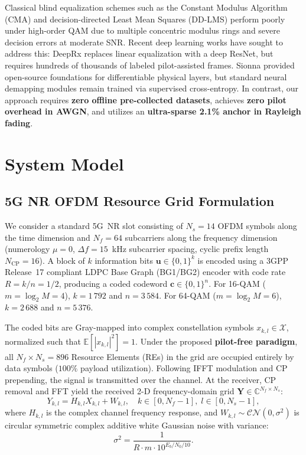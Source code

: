 ﻿\documentclass[journal,twoside]{IEEEtran}
\begin{document}
Classical blind equalization schemes such as the Constant Modulus Algorithm (CMA)
and decision-directed Least Mean Squares (DD-LMS) perform poorly under high-order QAM
due to multiple concentric modulus rings and severe decision errors at moderate SNR.
Recent deep learning works have sought to address this:
DeepRx \cite{honkala2021} replaces linear equalization with a deep ResNet, but requires
hundreds of thousands of labeled pilot-assisted frames.
Sionna \cite{hoydis2022} provided open-source foundations for differentiable physical
layers, but standard neural demapping modules remain trained via supervised cross-entropy.
In contrast, our approach requires \textbf{zero offline pre-collected datasets}, achieves
\textbf{zero pilot overhead in AWGN}, and utilizes an \textbf{ultra-sparse 2.1\% anchor in Rayleigh fading}.

\section{System Model}\label{sec:system}

\subsection{5G NR OFDM Resource Grid Formulation}

We consider a standard 5G~NR slot consisting of $N_s = 14$ OFDM symbols along the time
dimension and $N_f = 64$ subcarriers along the frequency dimension (numerology $\mu=0$,
$\Delta f = 15$~kHz subcarrier spacing, cyclic prefix length $N_{\text{CP}} = 16$).
A block of $k$ information bits $\mathbf{u} \in \{0,1\}^k$ is encoded using a 3GPP
Release~17 compliant LDPC Base Graph (BG1/BG2) encoder with code rate $R = k/n = 1/2$,
producing a coded codeword $\mathbf{c} \in \{0,1\}^n$.
For 16-QAM ($m = \log_2 M = 4$), $k = 1\,792$ and $n = 3\,584$.
For 64-QAM ($m = \log_2 M = 6$), $k = 2\,688$ and $n = 5\,376$.

The coded bits are Gray-mapped into complex constellation symbols
$x_{k,l} \in \mathcal{X}$, normalized such that $\mathbb{E}[|x_{k,l}|^2] = 1$.
Under the proposed \textbf{pilot-free paradigm}, all $N_f \times N_s = 896$ Resource Elements (REs)
in the grid are occupied entirely by data symbols ($100\%$ payload utilization).
Following IFFT modulation and CP prepending, the signal is transmitted over the channel.
At the receiver, CP removal and FFT yield the received 2-D frequency-domain grid
$\mathbf{Y} \in \mathbb{C}^{N_f \times N_s}$:
\begin{equation}\label{eq:channel}
  Y_{k,l} = H_{k,l} X_{k,l} + W_{k,l}, \quad k \in [0, N_f-1],\; l \in [0, N_s-1],
\end{equation}
where $H_{k,l}$ is the complex channel frequency response, and
$W_{k,l} \sim \mathcal{CN}(0, \sigma^2)$ is circular symmetric complex additive white
Gaussian noise with variance:
\begin{equation}\label{eq:noise_var}
  \sigma^2 = \frac{1}{R \cdot m \cdot 10^{E_b/N_0 / 10}}.
\end{equation}
\end{document}
